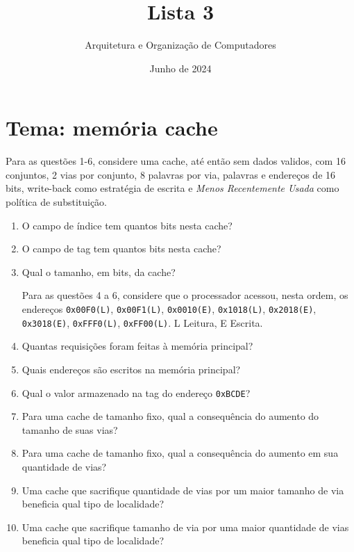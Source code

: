 \documentclass{article}
\title{\Huge Lista 3}
\author{\Large Arquitetura e Organização de Computadores}
\date{Junho de 2024}
\begin{document}
\large

\maketitle

\section*{Tema: memória cache}

Para as questões 1-6, considere uma cache, até então sem dados validos, com 16 conjuntos, 2 vias por conjunto, 8 palavras por via, palavras e endereços de 16 bits, write-back como estratégia de escrita e \textit{Menos Recentemente Usada} como política de substituição.

\begin{enumerate}

\item O campo de índice tem quantos bits nesta cache?

\item O campo de tag tem quantos bits nesta cache?

\item Qual o tamanho, em bits, da cache?

Para as questões 4 a 6, considere que o processador acessou, nesta ordem, os endereços \verb|0x00F0(L)|, \verb|0x00F1(L)|, \verb|0x0010(E)|, \verb|0x1018(L)|, \verb|0x2018(E)|, \verb|0x3018(E)|, \verb|0xFFF0(L)|, \verb|0xFF00(L)|. L \textrightarrow Leitura, E \textrightarrow Escrita.

\item Quantas requisições foram feitas à memória principal?

\item Quais endereços são escritos na memória principal?

\item Qual o valor armazenado na tag do endereço \verb|0xBCDE|?

\item Para uma cache de tamanho fixo, qual a consequência do aumento do tamanho de suas vias?

\item Para uma cache de tamanho fixo, qual a consequência do aumento em sua quantidade de vias?

\item Uma cache que sacrifique quantidade de vias por um maior tamanho de via beneficia qual tipo de localidade?

\item Uma cache que sacrifique tamanho de via por uma maior quantidade de vias beneficia qual tipo de localidade?


\end{enumerate}
\end{document}
